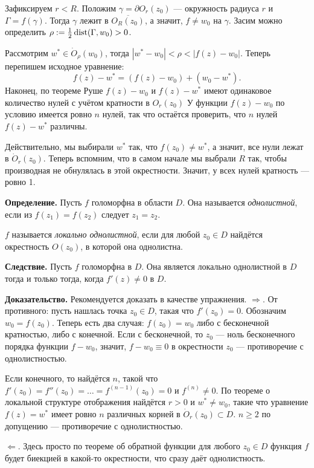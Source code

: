Зафиксируем $r < R$. Положим $\gamma = \partial O_r(z_0)$ --- окружность радиуса $r$ и $\Gamma = f(\gamma)$.
Тогда $\gamma$ лежит в $\overline{O_R(z_0)}$, а значит, $f \ne w_0$ на $\gamma$.
Засим можно определить $\rho := \frac{1}{2} \operatorname{dist}(\Gamma, w_0) > 0$.

Рассмотрим $w^* \in \dot O_\rho(w_0)$, тогда $|w^* - w_0| < \rho < |f(z) - w_0|$.
Теперь перепишем исходное уравнение:
\[
    f(z) - w^* = (f(z) - w_0) + (w_0 - w^*).
\]
Наконец, по теореме Руше $f(z) - w_0$ и $f(z) - w^*$ имеют одинаковое количество нулей с учётом кратности в $O_r(z_0)$
У функции $f(z) - w_0$ по условию имеется ровно $n$ нулей, так что остаётся проверить, что $n$ нулей $f(z) - w^*$ различны.

Действительно, мы выбирали $w^*$ так, что $f(z_0) \ne w^*$, а значит, все нули лежат в $\dot O_r(z_0)$.
Теперь вспомним, что в самом начале мы выбрали $R$ так, чтобы производная не обнулялась в этой окрестности.
Значит, у всех нулей кратность --- ровно 1.

\QED

\textbf{Определение.} Пусть $f$ голоморфна в области $D$.
Она называется \textit{однолистной}, если из $f(z_1) = f(z_2)$ следует $z_1 = z_2$.

$f$ называется \textit{локально однолистной}, если для любой $z_0 \in D$ найдётся окрестность $O(z_0)$, в которой она однолистна.

\textbf{Следствие.} Пусть $f$ голоморфна в $D$.
Она является локально однолистной в $D$ тогда и только тогда, когда $f'(z) \ne 0$ в $D$.

\textbf{Доказательство.} Рекомендуется доказать в качестве упражнения.
$\Rightarrow$. От противного: пусть нашлась точка $z_0 \in D$, такая что $f'(z_0) = 0$.
Обозначим $w_0 = f(z_0)$.
Теперь есть два случая: $f(z_0) = w_0$ либо с бесконечной кратностью, либо с конечной.
Если с бесконечной, то $z_0$ --- ноль бесконечного порядка функции $f - w_0$, значит, $f - w_0 \equiv 0$ в окрестности $z_0$ --- противоречие с однолистностью.

Если конечного, то найдётся $n$, такой что $f'(z_0) = f''(z_0) = \dots = f^{(n-1)}(z_0) = 0$ и $f^{(n)} \ne 0$.
По теореме о локальной структуре отображения найдётся $r > 0$ и $w^* \ne w_0$, такие что уравнение $f(z) = w^*$ имеет ровно $n$ различных корней в $\dot O_r(z_0) \subset D$.
$n \ge 2$ по допущению --- противоречие с однолистностью.

$\Leftarrow$. Здесь просто по теореме об обратной функции для любого $z_0 \in D$ функция $f$ будет биекцией в какой-то окрестности, что сразу даёт однолистность.

